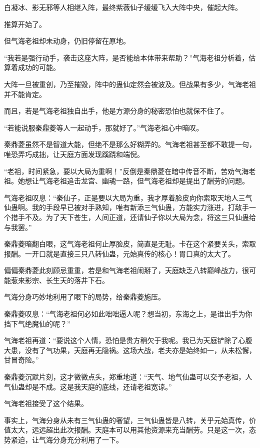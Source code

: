 
\begin{this_body}

白凝冰、影无邪等人相继入阵，最终紫薇仙子缓缓飞入大阵中央，催起大阵。

推算开始了。

但气海老祖却未动身，仍旧停留在原地。

“我若是强行动手，袭击这座大阵，是否能给本体带来帮助？”气海老祖分析着，估算着成功的可能。

大阵一旦被重创，乃至摧毁，阵中的蛊仙定然会被波及。但战果有多少，气海老祖并不能肯定。

而且，若是气海老祖独自出手，他是方源分身的秘密恐怕也就保不住了。

“若能说服秦鼎菱等人一起动手，那就好了。”气海老祖心中暗叹。

秦鼎菱虽然不是智道大能，但绝不是那么好糊弄的。气海老祖甚至都不敢提一句，唯恐弄巧成拙，让天庭方面发现蹊跷和端倪。

“老祖，时间紧急，要以大局为重啊！”反倒是秦鼎菱在暗中传音不断，苦劝气海老祖。她想让气海老祖追击龙宫、幽魂一路，但气海老祖却是提出了酬劳的问题。

气海老祖叹息：“秦仙子，正是要以大局为重，我才厚着脸皮向你索取天地人三气仙蛊啊。我的手段早已被对手熟知，唯有新添三气仙蛊，方能实力涨进，打敌手一个措手不及。为了天下苍生，人间正道，还请仙子你以大局为念，将这三只仙蛊给与我罢。”

秦鼎菱暗翻白眼，这气海老祖何止厚脸皮，简直是无耻。卡在这个紧要关头，索取报酬。一开口就是直接三只八转仙蛊，元始真传的核心！胃口真的太大了。

偏偏秦鼎菱此刻顾忌重重，若是和气海老祖闹掰了，天庭缺乏八转巅峰战力，很可能惹来影宗、长生天的落井下石。

气海分身巧妙地利用了眼下的局势，给秦鼎菱施压。

秦鼎菱叹息：“气海老祖何必如此咄咄逼人呢？想当初，东海之上，是谁出手为你挡下气绝魔仙的呢？”

气海老祖再道：“要说这个人情，恐怕是贵方稍欠于我呢。我已为天庭铲除了心腹大患，没有了气功果，天庭再无隐祸。这场大战，老夫亦是始终如一，从未松懈，甘冒奇险。”

秦鼎菱沉默片刻，这才微微点头，郑重地道：“天气、地气仙蛊可以交予老祖，人气仙蛊却是不成。这是我天庭的底线，还请老祖宽谅。”

气海老祖接受了这个结果。

事实上，气海分身从未有三气仙蛊的奢望，三气仙蛊皆是八转，关乎元始真传，价值太大，远远超出此次报酬。天庭本可以用其他资源来充当酬劳。只是这一次，态势紧迫，让气海分身充分利用了一下。


\end{this_body}
